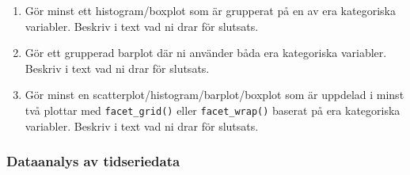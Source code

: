 \documentclass[swedish,english]{article}\usepackage[]{graphicx}\usepackage[]{xcolor}
\begin{document}
\begin{enumerate}
\begin{enumerate}
\item Gör minst ett histogram/boxplot som är grupperat på en av era kategoriska
variabler. Beskriv i text vad ni drar för slutsats.
\item Gör ett grupperad barplot där ni använder båda era kategoriska variabler.
Beskriv i text vad ni drar för slutsats.
\item Gör minst en scatterplot/histogram/barplot/boxplot som är uppdelad
i minst två plottar med \texttt{facet\_grid()} eller \texttt{facet\_wrap()}
baserat på era kategoriska variabler. Beskriv i text vad ni drar för
slutsats.
\end{enumerate}
\end{enumerate}

\subsubsection{Dataanalys av tidseriedata }
\end{document}
